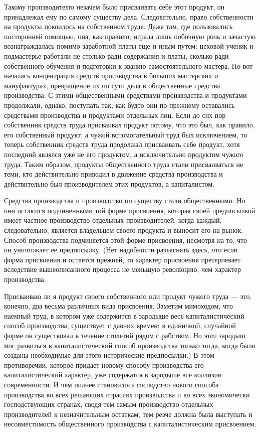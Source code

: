 \documentclass[12pt]{article}
\newcommand{\parnum}{(\arabic{parcount})}
\newcounter{parcount}
\newenvironment{parnumbers}{%
  \par%
  \everypar{\noindent \stepcounter{parcount}\marginpar[]{\parnum}}%
}{}
\begin{document}
\begin{parnumbers}
    Такому производителю незачем было присваивать себе этот продукт, он принадлежал ему по самому существу дела. Следовательно, право собственности на продукты покоилось на собственном труде. Даже там, где пользовались посторонней помощью, она, как правило, играла лишь побочную роль и зачастую вознаграждалась помимо заработной платы еще и иным путем: цеховой ученик и подмастерье работали не столько ради содержания и платы, сколько ради собственного обучения и подготовки к званию самостоятельного мастера. Но вот началась концентрация средств производства в больших мастерских и мануфактурах, превращение их по сути дела в общественные средства производства. С этими общественными средствами производства и продуктами продолжали, однако, поступать так, как будто они по-прежнему оставались средствами производства и продуктами отдельных лиц. Если до сих пор собственник средств труда присваивал продукт потому, что это был, как правило, его собственный продукт, а чужой вспомогательный труд был исключением, то теперь собственник средств труда продолжал присваивать себе продукт, хотя последний являлся уже не его продуктом, а исключительно продуктом чужого труда. Таким образом, продукты общественного труда стали присваиваться не теми, кто действительно приводил в движение средства производства и действительно был производителем этих продуктов, а капиталистом.

    Средства производства и производство по существу стали общественными. Но они остаются подчиненными той форме присвоения, которая своей предпосылкой имеет частное производство отдельных производителей, когда каждый, следовательно, является владельцем своего продукта и выносит его на рынок. Способ производства подчиняется этой форме присвоения, несмотря на то, что он уничтожает ее предпосылку. (Нет надобности разъяснять здесь, что если форма присвоения и остается прежней, то характер присвоения претерпевает вследствие вышеописанного процесса не меньшую революцию, чем характер производства.

    Присваиваю ли я продукт своего собственного или продукт чужого труда — это, конечно, два весьма различных вида присвоения. Заметим мимоходом, что наемный труд, в котором уже содержится в зародыше весь капиталистический способ производства, существует с давних времен; в единичной, случайной форме он существовал в течение столетий рядом с рабством. Но этот зародыш мог развиться в капиталистический способ производства только тогда, когда были созданы необходимые для этого исторические предпосылки.) В этом противоречии, которое придает новому способу производства его капиталистический характер, уже содержатся в зародыше все коллизии современности. И чем полнее становилось господство нового способа производства во всех решающих отраслях производства и во всех экономически господствующих странах, сводя тем самым производство отдельных производителей к незначительным остаткам, тем резче должна была выступать и несовместимость общественного производства с капиталистическим присвоением.


\end{parnumbers}
\end{document}
